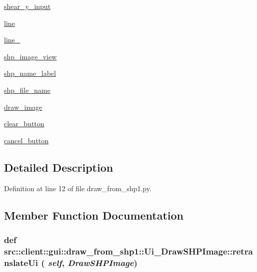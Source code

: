 \begin{DoxyCompactItemize}
\item 
\hyperlink{classsrc_1_1client_1_1gui_1_1draw__from__shp1_1_1Ui__DrawSHPImage_a54ff0d70aaa68e48b5008a842c252d1c}{shear\_\-y\_\-input}
\item 
\hyperlink{classsrc_1_1client_1_1gui_1_1draw__from__shp1_1_1Ui__DrawSHPImage_aa53d0a074c3fe7aaa5c0152aea634142}{line}
\item 
\hyperlink{classsrc_1_1client_1_1gui_1_1draw__from__shp1_1_1Ui__DrawSHPImage_a421943f9f14cf4a41beb77fc5a7f0b3b}{line\_}
\item 
\hyperlink{classsrc_1_1client_1_1gui_1_1draw__from__shp1_1_1Ui__DrawSHPImage_a2caae198b287eebf033a25400bcf019d}{shp\_\-image\_\-view}
\item 
\hyperlink{classsrc_1_1client_1_1gui_1_1draw__from__shp1_1_1Ui__DrawSHPImage_a025bfebb19ed612786800b519ea0c959}{shp\_\-name\_\-label}
\item 
\hyperlink{classsrc_1_1client_1_1gui_1_1draw__from__shp1_1_1Ui__DrawSHPImage_a6cd76f385826a48fef01cb35120cfe52}{shp\_\-file\_\-name}
\item 
\hyperlink{classsrc_1_1client_1_1gui_1_1draw__from__shp1_1_1Ui__DrawSHPImage_ace9826eb043584e6f0ec061dd7f3b96d}{draw\_\-image}
\item 
\hyperlink{classsrc_1_1client_1_1gui_1_1draw__from__shp1_1_1Ui__DrawSHPImage_a9ae9fa38c3d7bea797a9aeb560480972}{clear\_\-button}
\item 
\hyperlink{classsrc_1_1client_1_1gui_1_1draw__from__shp1_1_1Ui__DrawSHPImage_a48bf48fe9355cbd1d282e86cad77ded5}{cancel\_\-button}
\end{DoxyCompactItemize}


\subsection{Detailed Description}


Definition at line 12 of file draw\_\-from\_\-shp1.py.



\subsection{Member Function Documentation}
\hypertarget{classsrc_1_1client_1_1gui_1_1draw__from__shp1_1_1Ui__DrawSHPImage_ae02de759d5138754f10c2961987a2da3}{
\subsubsection[{retranslateUi}]{\setlength{\rightskip}{0pt plus 5cm}def src::client::gui::draw\_\-from\_\-shp1::Ui\_\-DrawSHPImage::retranslateUi ( {\em self}, \/   {\em DrawSHPImage})}}
\label{classsrc_1_1client_1_1gui_1_1draw__from__shp1_1_1Ui__DrawSHPImage_ae02de759d5138754f10c2961987a2da3}


